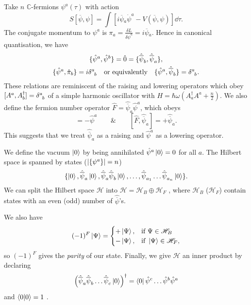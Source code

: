 Take $n$  $\mathbb{C}$-fermions $\psi^a(\tau)$  with action
\begin{equation}
  S[\overline{\psi}{}, \psi] = \int \left[ i \overline{\psi}{}_a \dot{\psi}^a - V(\overline{\psi}{}, \psi) \right] \dd \tau.
\end{equation}
The conjugate momentum to $\psi^a$ is  $\pi_a = \frac{\delta L}{\delta \dot{\psi}^a} = i \overline{\psi}{}_a$.
Hence in canonical quantisation, we have
\begin{gather}
  \{\hat{\psi}^a, \hat{\psi}^b\} = \hat{0} = \{\hat{\overline{\psi}{}}_b, \hat{\overline{\psi}{}}_a\}, \\
  \{\hat{\psi}^a, \hat{\pi}_b\} = i \delta\indices{^{a}_{b}} \quad \text{or equivalently}\quad \{\hat{\psi}^a, \hat{\overline{\psi}{}}_b\} = \delta\indices{^{a}_{b}}.
\end{gather}
These relations are reminiscent of the raising and lowering operators which obey $[A^a, A^{\dagger}_b] = \delta\indices{^{a}_{b}}$ of a simple harmonic oscillator with $H = \hbar \omega (A^{\dagger}_a A^{a} + \frac{n}{2})$.
We also define the fermion number operator $\hat{F} = \hat{\overline{\psi}{}}_a \hat{\psi}^a$, which obeys
\begin{equation}
  [\hat{F}, \hat{\psi}^a] = - \hat{\psi}^a \qquad \& \qquad [\hat{F}, \hat{\overline{\psi}{}}_a] = + \hat{\overline{\psi}{}}_a.
\end{equation}
This suggests that we treat $\hat{\overline{\psi}{}}_a$ as a raising and $\hat{\psi}^a$ as a lowering operator.

We define the vacuum $\ket{0}$ by being annihilated $\hat\psi^a\ket{0} = 0$ for all $a$.
The Hilbert space is spanned by states ($\abs{\{\psi^a\}} = n$)
\begin{equation}
  \{\ket{0}, \hat{\overline{\psi}}_a \ket{0}, \hat{\overline{\psi}}_a \hat{\overline{\psi}}_b \ket{0}, \dots, \hat{\overline{\psi}}_{a_1} \dots \hat{\overline{\psi}}_{a_n} \ket{0} \}.
\end{equation}
We can split the Hilbert space $\mathscr{H}$  into $\mathscr{H} = \mathscr{H}_B \oplus \mathscr{H}_F$ , where $\mathscr{H}_B$  ($\mathscr{H}_F$) contain states with an even (odd) number of $\hat{\overline{\psi}}$'s.

We also have
 \begin{equation}
  (-1)^F \ket{\Psi} = 
  \begin{cases}
    + \ket{\Psi}, & \text{if } \Psi \in \mathscr{H}_B \\
    - \ket{\Psi}, & \text{if } \ket{\Psi} \in \mathscr{H}_F,
  \end{cases}
\end{equation}
so $(-1)^F$  gives the \emph{parity} of our state. Finally, we give $\mathscr{H}$  an inner product by declaring
\begin{equation}
  \left( \hat{\overline{\psi}}_{a} \hat{\overline{\psi}}_{b} \dots \hat{\overline{\psi}}_{c} \ket{0} \right)^{\dagger} = \bra{0} \hat{\psi}^{c} \dots \hat{\psi}^{b} \hat{\psi}^{a}
\end{equation}
and $\bra{0}\ket{0} = 1$ .

